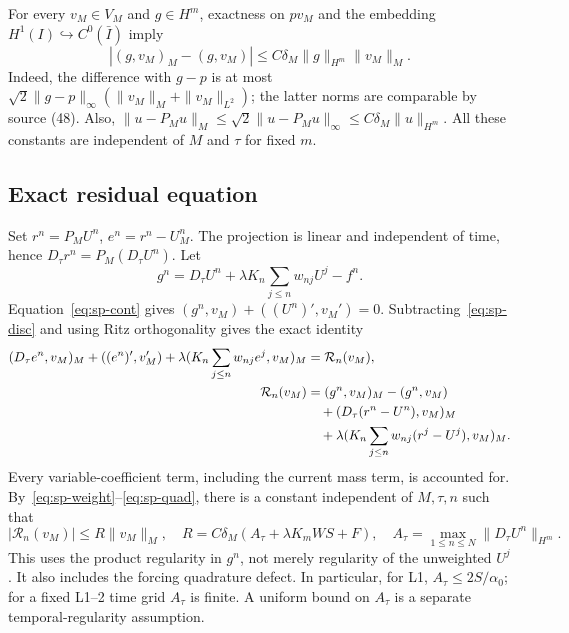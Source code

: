 \documentclass[11pt,a4paper]{amsart}
\theoremstyle{remark}
\theoremstyle{plain}
\theoremstyle{remark}
\numberwithin{equation}{section}
\begin{document}
For every $v_M\in V_M$ and $g\in H^m$, exactness on $pv_M$ and the embedding $H^1(I)\hookrightarrow C^0(\bar I)$ imply
\begin{equation}\label{eq:sp-quad}
 |(g,v_M)_M-(g,v_M)|\le C\delta_M\|g\|_{H^m}\|v_M\|_M.
\end{equation}
Indeed, the difference with $g-p$ is at most $\sqrt{2}\|g-p\|_\infty(\|v_M\|_M+\|v_M\|_{L^2})$; the latter norms are comparable by source (48). Also, $\|u-P_Mu\|_M\le\sqrt2\|u-P_Mu\|_\infty\le C\delta_M\|u\|_{H^m}$. All these constants are independent of $M$ and $\tau$ for fixed $m$.

\subsection{Exact residual equation}
Set $r^n=P_MU^n$, $e^n=r^n-U_M^n$. The projection is linear and independent of time, hence $D_\tau r^n=P_M(D_\tau U^n)$. Let
\[
 g^n=D_\tau U^n+\lambda K_n\sum_{j\le n}w_{nj}U^j-f^n.
\]
Equation~\eqref{eq:sp-cont} gives $(g^n,v_M)+( (U^n)',v_M')=0$. Subtracting~\eqref{eq:sp-disc} and using Ritz orthogonality gives the exact identity
\begin{align}
 (D_\tau e^n,v_M)_M+((e^n)',v_M')+\lambda(K_n\sum_{j\le n}w_{nj}e^j,v_M)_M &=\mathcal R_n(v_M),\label{eq:sp-error}\\
 \mathcal R_n(v_M)&=(g^n,v_M)_M-(g^n,v_M)\notag\\
 &\quad +(D_\tau(r^n-U^n),v_M)_M\notag\\
 &\quad +\lambda(K_n\sum_{j\le n}w_{nj}(r^j-U^j),v_M)_M.\notag
\end{align}
Every variable-coefficient term, including the current mass term, is accounted for. By~\eqref{eq:sp-weight}--\eqref{eq:sp-quad}, there is a constant independent of $M,\tau,n$ such that
\begin{equation}\label{eq:sp-R}
 |\mathcal R_n(v_M)|\le R\|v_M\|_M,\quad
 R=C\delta_M\left(A_\tau+\lambda K_m W S+F\right),\quad
 A_\tau=\max_{1\le n\le N}\|D_\tau U^n\|_{H^m}.
\end{equation}
This uses the product regularity in $g^n$, not merely regularity of the unweighted $U^j$. It also includes the forcing quadrature defect. In particular, for L1, $A_\tau\le 2S/\alpha_0$; for a fixed L1--2 time grid $A_\tau$ is finite. A uniform bound on $A_\tau$ is a separate temporal-regularity assumption.
\end{document}
